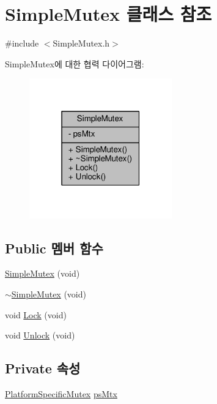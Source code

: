\hypertarget{class_simple_mutex}{}\section{Simple\+Mutex 클래스 참조}
\label{class_simple_mutex}


{\ttfamily \#include $<$Simple\+Mutex.\+h$>$}



Simple\+Mutex에 대한 협력 다이어그램\+:
\nopagebreak
\begin{figure}[H]
\begin{center}
\leavevmode
\includegraphics[width=175pt]{class_simple_mutex__coll__graph}
\end{center}
\end{figure}
\subsection*{Public 멤버 함수}
\begin{DoxyCompactItemize}
\item 
\hyperlink{class_simple_mutex_ab64b9a57850abc87bbb583da95945d9d}{Simple\+Mutex} (void)
\item 
\hyperlink{class_simple_mutex_a1a4028467473599b2c3547f89056cec8}{$\sim$\+Simple\+Mutex} (void)
\item 
void \hyperlink{class_simple_mutex_aaf4421ed012f07118fb821fee61ed047}{Lock} (void)
\item 
void \hyperlink{class_simple_mutex_a1858afc83c216d0a817833e7cf040452}{Unlock} (void)
\end{DoxyCompactItemize}
\subsection*{Private 속성}
\begin{DoxyCompactItemize}
\item 
\hyperlink{_platform_specific_functions__c_8h_a4b99a1885729c2c2ad1c4ae77a43a7ad}{Platform\+Specific\+Mutex} \hyperlink{class_simple_mutex_a2d8e2215b7f2fde314c24c25b79c466b}{ps\+Mtx}
\end{DoxyCompactItemize}


